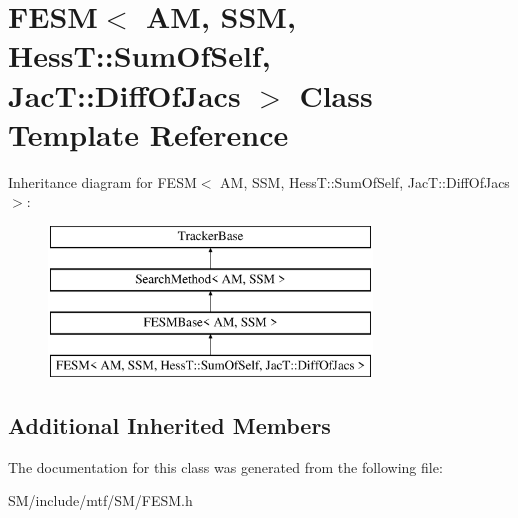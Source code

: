 \hypertarget{classFESM_3_01AM_00_01SSM_00_01HessT_1_1SumOfSelf_00_01JacT_1_1DiffOfJacs_01_4}{\section{F\-E\-S\-M$<$ A\-M, S\-S\-M, Hess\-T\-:\-:Sum\-Of\-Self, Jac\-T\-:\-:Diff\-Of\-Jacs $>$ Class Template Reference}
\label{classFESM_3_01AM_00_01SSM_00_01HessT_1_1SumOfSelf_00_01JacT_1_1DiffOfJacs_01_4}
}
Inheritance diagram for F\-E\-S\-M$<$ A\-M, S\-S\-M, Hess\-T\-:\-:Sum\-Of\-Self, Jac\-T\-:\-:Diff\-Of\-Jacs $>$\-:\begin{figure}[H]
\begin{center}
\leavevmode
\includegraphics[height=4.000000cm]{classFESM_3_01AM_00_01SSM_00_01HessT_1_1SumOfSelf_00_01JacT_1_1DiffOfJacs_01_4}
\end{center}
\end{figure}
\subsection*{Additional Inherited Members}


The documentation for this class was generated from the following file\-:\begin{DoxyCompactItemize}
\item 
S\-M/include/mtf/\-S\-M/F\-E\-S\-M.\-h\end{DoxyCompactItemize}
